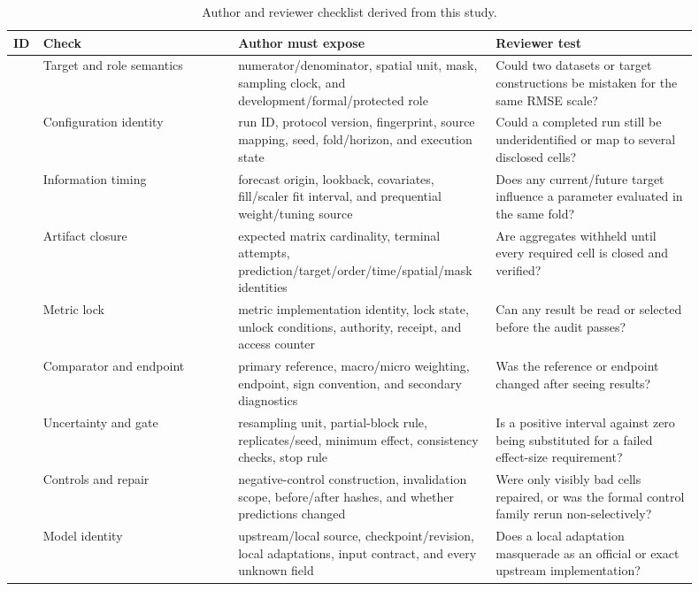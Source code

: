 \begin{table}[htbp]
\centering
\caption{Author and reviewer checklist derived from this study.}
\label{tab:audit-checklist}
\scriptsize
\begin{tabular}{>{\raggedright\arraybackslash}p{0.035\linewidth}>{\raggedright\arraybackslash}p{0.27\linewidth}>{\raggedright\arraybackslash}p{0.30\linewidth}>{\raggedright\arraybackslash}p{0.29\linewidth}}
\toprule
ID & Check & Author must expose & Reviewer test \\
\midrule
1 & Target and role semantics & numerator/denominator, spatial unit, mask, sampling clock, and development/formal/protected role & Could two datasets or target constructions be mistaken for the same RMSE scale? \\
2 & Configuration identity & run ID, protocol version, fingerprint, source mapping, seed, fold/horizon, and execution state & Could a completed run still be underidentified or map to several disclosed cells? \\
3 & Information timing & forecast origin, lookback, covariates, fill/scaler fit interval, and prequential weight/tuning source & Does any current/future target influence a parameter evaluated in the same fold? \\
4 & Artifact closure & expected matrix cardinality, terminal attempts, prediction/target/order/time/spatial/mask identities & Are aggregates withheld until every required cell is closed and verified? \\
5 & Metric lock & metric implementation identity, lock state, unlock conditions, authority, receipt, and access counter & Can any result be read or selected before the audit passes? \\
6 & Comparator and endpoint & primary reference, macro/micro weighting, endpoint, sign convention, and secondary diagnostics & Was the reference or endpoint changed after seeing results? \\
7 & Uncertainty and gate & resampling unit, partial-block rule, replicates/seed, minimum effect, consistency checks, stop rule & Is a positive interval against zero being substituted for a failed effect-size requirement? \\
8 & Controls and repair & negative-control construction, invalidation scope, before/after hashes, and whether predictions changed & Were only visibly bad cells repaired, or was the formal control family rerun non-selectively? \\
9 & Model identity & upstream/local source, checkpoint/revision, local adaptations, input contract, and every unknown field & Does a local adaptation masquerade as an official or exact upstream implementation? \\

\end{tabular}
\end{table}
